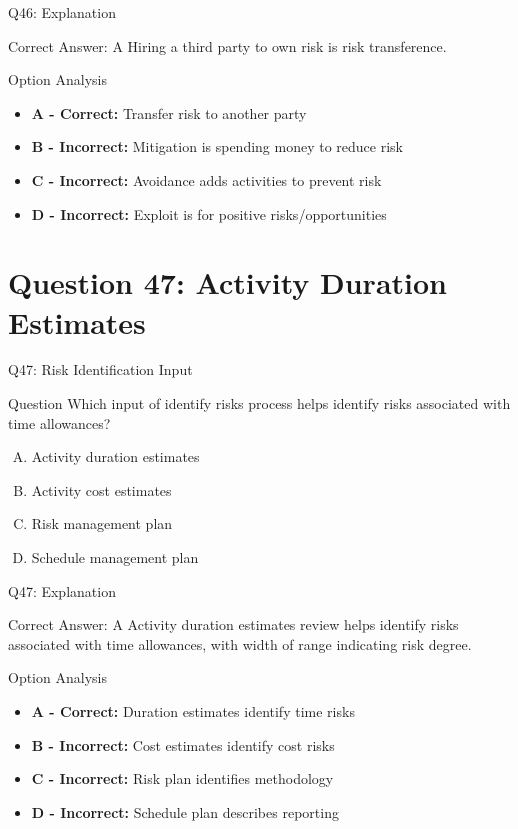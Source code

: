\documentclass{beamer}
\begin{document}
	\begin{frame}{Q46: Explanation}
		\begin{block}{Correct Answer: A}
			Hiring a third party to own risk is risk transference.
		\end{block}
		\begin{block}{Option Analysis}
			\begin{itemize}
				\item \textbf{A - Correct:} Transfer risk to another party
				\item \textbf{B - Incorrect:} Mitigation is spending money to reduce risk
				\item \textbf{C - Incorrect:} Avoidance adds activities to prevent risk
				\item \textbf{D - Incorrect:} Exploit is for positive risks/opportunities
			\end{itemize}
		\end{block}
	\end{frame}
	
	\section{Question 47: Activity Duration Estimates}
	
	\begin{frame}{Q47: Risk Identification Input}
		\begin{block}{Question}
			Which input of identify risks process helps identify risks associated with time allowances?
		\end{block}
		\begin{enumerate}[(A)]
			\item Activity duration estimates
			\item Activity cost estimates
			\item Risk management plan
			\item Schedule management plan
		\end{enumerate}
	\end{frame}
	
	\begin{frame}{Q47: Explanation}
		\begin{block}{Correct Answer: A}
			Activity duration estimates review helps identify risks associated with time allowances, with width of range indicating risk degree.
		\end{block}
		\begin{block}{Option Analysis}
			\begin{itemize}
				\item \textbf{A - Correct:} Duration estimates identify time risks
				\item \textbf{B - Incorrect:} Cost estimates identify cost risks
				\item \textbf{C - Incorrect:} Risk plan identifies methodology
				\item \textbf{D - Incorrect:} Schedule plan describes reporting
			\end{itemize}
		\end{block}
	\end{frame}
	
\end{document}
